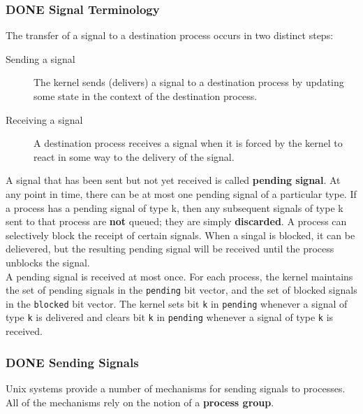 \documentclass[11pt]{article}
\begin{document}
\subsubsection{{\bfseries\sffamily DONE} Signal Terminology}
\label{sec:org5b86d9c}
The transfer of a signal to a destination process occurs in two distinct steps:\\
\begin{description}
\item[{Sending a signal}] The kernel sends (delivers) a signal to a destination process by updating some state in the context of the destination process.\\
\item[{Receiving a signal}] A destination process receives a signal when it is forced by the kernel to react in some way to the delivery of the signal.\\
\end{description}


A signal that has been sent but not yet received is called \textbf{pending signal}. At any point in time, there can be at most one pending signal of a particular type. If a process has a pending signal of type k, then any subsequent signals of type k sent to that process are \textbf{not} queued; they are simply \textbf{discarded}. A process can selectively block the receipt of certain signals. When a singal is blocked, it can be delievered, but the resulting pending signal will be received until the process unblocks the signal.\\

A pending signal is received at most once. For each process, the kernel maintains the set of pending signals in the \texttt{pending} bit vector, and the set of blocked signals in the \texttt{blocked} bit vector. The kernel sets bit \texttt{k} in \texttt{pending} whenever a signal of type \texttt{k} is delivered and clears bit \texttt{k} in \texttt{pending} whenever a signal of type \texttt{k} is received.\\


\subsubsection{{\bfseries\sffamily DONE} Sending Signals}
\label{sec:orgbabe3ee}
Unix systems provide a number of mechanisms for sending signals to processes. All of the mechanisms rely on the notion of a \textbf{process group}.\\
\end{document}
